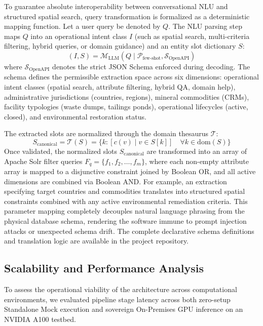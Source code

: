 To guarantee absolute interoperability between conversational NLU and structured spatial search, query transformation is formalized as a deterministic mapping function. Let a user query be denoted by $Q$. The NLU parsing step maps $Q$ into an operational intent class $I$ (such as spatial search, multi-criteria filtering, hybrid queries, or domain guidance) and an entity slot dictionary $S$:
\begin{equation}
    (I, S) = \mathcal{M}_{\text{LLM}}(Q \mid \mathcal{P}_{\text{few-shot}}, \mathcal{S}_{\text{OpenAPI}})
\end{equation}
where $\mathcal{S}_{\text{OpenAPI}}$ denotes the strict JSON Schema enforced during decoding. The schema defines the permissible extraction space across six dimensions: operational intent classes (spatial search, attribute filtering, hybrid QA, domain help), administrative jurisdictions (countries, regions), mineral commodities (CRMs), facility typologies (waste dumps, tailings ponds), operational lifecycles (active, closed), and environmental restoration status.

The extracted slots are normalized through the domain thesaurus $\mathcal{T}$:
\begin{equation}
    S_{\text{canonical}} = \mathcal{T}(S) = \{k: [c(v) \mid v \in S[k]] \quad \forall k \in \text{dom}(S)\}
\end{equation}
Once validated, the normalized slots $S_{\text{canonical}}$ are transformed into an array of Apache Solr filter queries $F_q = \{f_1, f_2, \dots, f_m\}$, where each non-empty attribute array is mapped to a disjunctive constraint joined by Boolean OR, and all active dimensions are combined via Boolean AND. For example, an extraction specifying target countries and commodities translates into structured spatial constraints combined with any active environmental remediation criteria. This parameter mapping completely decouples natural language phrasing from the physical database schema, rendering the software immune to prompt injection attacks or unexpected schema drift. The complete declarative schema definitions and translation logic are available in the project repository.

\subsection{Scalability and Performance Analysis}
\label{subsec:ScalabilityPerformance}

To assess the operational viability of the architecture across computational environments, we evaluated pipeline stage latency across both zero-setup Standalone Mock execution and sovereign On-Premises GPU inference on an NVIDIA A100 testbed.

